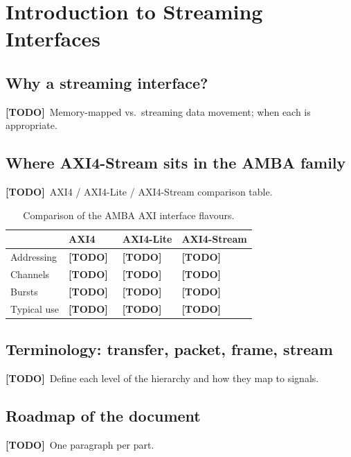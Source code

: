 \documentclass[11pt,a4paper,oneside]{report}
\newif\ifshowtodo\showtodotrue
\newcommand{\TODO}[1]{\ifshowtodo\textcolor{red!70!black}{\small\textbf{[TODO]}~#1}\fi}
\begin{document}
\chapter{Introduction to Streaming Interfaces}

\section{Why a streaming interface?}
\TODO{Memory-mapped vs.\ streaming data movement; when each is appropriate.}

\section{Where AXI4-Stream sits in the AMBA family}
\TODO{AXI4 / AXI4-Lite / AXI4-Stream comparison table.}

\begin{table}[H]
  \centering
  \caption{Comparison of the AMBA AXI interface flavours.}
  \label{tab:axi-flavours}
  \begin{tabularx}{\textwidth}{l X X X}
    \toprule
    & \textbf{AXI4} & \textbf{AXI4-Lite} & \textbf{AXI4-Stream} \\
    \midrule
    Addressing      & \TODO{} & \TODO{} & \TODO{} \\
    Channels        & \TODO{} & \TODO{} & \TODO{} \\
    Bursts          & \TODO{} & \TODO{} & \TODO{} \\
    Typical use     & \TODO{} & \TODO{} & \TODO{} \\
    \bottomrule
  \end{tabularx}
\end{table}

\section{Terminology: transfer, packet, frame, stream}
\TODO{Define each level of the hierarchy and how they map to signals.}

\section{Roadmap of the document}
\TODO{One paragraph per part.}

\end{document}
